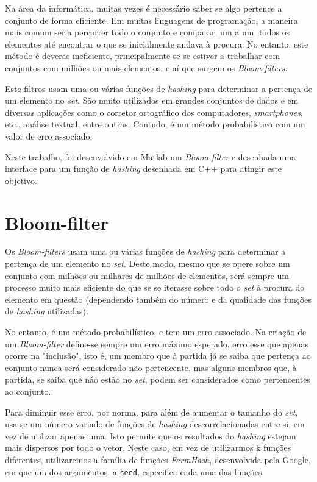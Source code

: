 \documentclass[a4paper,11pt,openright,oneside]{report}
\begin{document}
Na área da informática, muitas vezes é necessário saber se algo pertence a conjunto de forma eficiente. Em muitas linguagens de programação, a maneira mais comum seria percorrer todo o conjunto e comparar, um a um, todos os elementos até encontrar o que se inicialmente andava à procura. No entanto, este método é deveras ineficiente, principalmente se se estiver a trabalhar com conjuntos com milhões ou mais elementos, e aí que surgem os \textit{Bloom-filters}. 

Este filtros usam uma ou várias funções de \textit{hashing} para determinar a pertença de um elemento no \textit{set}. São muito utilizados em grandes conjuntos de dados e em diversas aplicações como o corretor ortográfico dos computadores, \textit{smartphones}, etc., análise textual, entre outras. Contudo, é um método probabilístico com um valor de erro associado.

Neste trabalho, foi desenvolvido em Matlab um \textit{Bloom-filter} e desenhada uma interface para um função de \textit{hashing} desenhada em C++ para atingir este objetivo.

\chapter{Bloom-filter}
\label{chap.bloom}

Os \textit{Bloom-filters} usam uma ou várias funções de \textit{hashing} para determinar a pertença de um elemento no \textit{set}. Deste modo, mesmo que se opere sobre um conjunto com milhões ou milhares de milhões de elementos, será sempre um processo muito mais eficiente do que se se iterasse sobre todo o \textit{set} à procura do elemento em questão (dependendo também do número e da qualidade das funções de \textit{hashing} utilizadas).

No entanto, é um método probabilístico, e tem um erro associado. Na criação de um \textit{Bloom-filter} define-se sempre um erro máximo esperado, erro esse que apenas ocorre na "inclusão", isto é, um membro que à partida já se saiba que pertença ao conjunto nunca será considerado não pertencente, mas alguns membros que, à partida, se saiba que não estão no \textit{set}, podem ser considerados como pertencentes ao conjunto.

Para diminuir esse erro, por norma, para além de aumentar o tamanho do \textit{set}, usa-se um número variado de funções de \textit{hashing} descorrelacionadas entre si, em vez de utilizar apenas uma. Isto permite que os resultados do \textit{hashing} estejam mais dispersos por todo o vetor. Neste caso, em vez de utilizarmos k funções diferentes, utilizaremos a família de funções \textit{FarmHash}, desenvolvida pela Google, em que um dos argumentos, a \texttt{seed}, especifica cada uma das funções.
\end{document}
